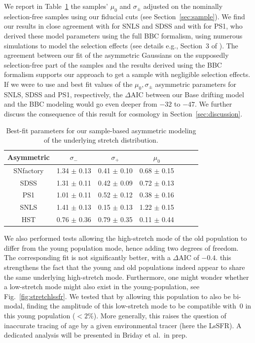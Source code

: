 \documentclass[]{aa}
\begin{document}
We report in Table~\ref{tab:bbc} the samples' $\mu_0$ and $\sigma_{\pm}$
adjusted on the nominally selection-free samples using our fiducial cuts (see
Section~\ref{sec:sample}). We find our results in close agreement with
\cite{scolnic2016} for SNLS and SDSS and with \cite{scolnic2018a} for PS1, who
derived these model parameters using the full BBC formalism, using numerous
simulations to model the selection effects (see details e.g., Section~3 of
\citealt{kessler2017}). The agreement between our fit of the asymmetric
Gaussians on the supposedly selection-free part of the samples and the results
derived using the BBC formalism supports our approach to get a sample with
negligible selection effects. If we were to use \cite{scolnic2016} and
\cite{scolnic2018a} best fit values of the $\mu_0, \sigma_{\pm}$ asymmetric
parameters for SNLS, SDSS and PS1, respectively, the $\Delta$AIC between our
Base drifting model and the BBC modeling would go even deeper from $-32$ to
$-47$. We further discuss the consequence of this result for cosmology in
Section~\ref{sec:discussion}.
    
\begin{table}
    \centering
    \caption{Best-fit parameters for our sample-based asymmetric modeling of the
    underlying stretch distribution.}
    \label{tab:bbc}
    \begin{tabular}{ccccccc}
    \hline\hline
    Asymmetric & $\sigma_{-}$    & $\sigma_{+}$    & $\mu_0$ \\
    \hline
    SNfactory  & 1.34 $\pm$ 0.13 & 0.41 $\pm$ 0.10 & 0.68 $\pm$ 0.15 \\
    SDSS       & 1.31 $\pm$ 0.11 & 0.42 $\pm$ 0.09 & 0.72 $\pm$ 0.13 \\
    PS1        & 1.01 $\pm$ 0.11 & 0.52 $\pm$ 0.12 & 0.38 $\pm$ 0.16 \\
    SNLS       & 1.41 $\pm$ 0.13 & 0.15 $\pm$ 0.13 & 1.22 $\pm$ 0.15 \\
    HST        & 0.76 $\pm$ 0.36 & 0.79 $\pm$ 0.35 & 0.11 $\pm$ 0.44 \\
    \hline
    \end{tabular}
\end{table}
    
We also performed tests allowing the high-stretch mode of the old population to
differ from the young population mode, hence adding two degrees of freedom. The
corresponding fit is not significantly better, with a $\Delta$AIC of $-0.4$.
this strengthens the fact that the young and old populations indeed appear to
share the same underlying high-stretch mode.  Furthermore, one might wonder
whether a low-stretch mode might also exist in the young-population, see
Fig.~\ref{fig:stretchlssfr}. We tested that by allowing this population to also
be bi-modal, finding the amplitude of this low-stretch mode to be compatible
with~0 in this young population ($<2\%$). More generally, this raises the
question of inaccurate tracing of age by a given environmental tracer (here the
LsSFR). A dedicated analysis will be presented in Briday et al.\ in prep.
\end{document}
